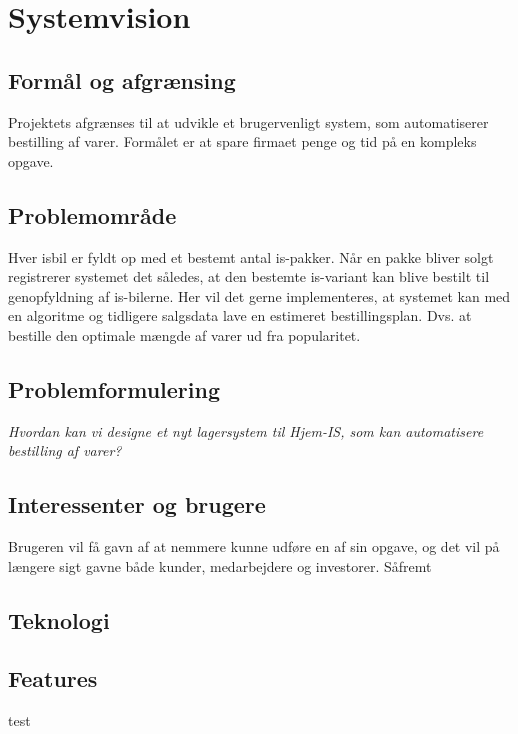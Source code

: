 \chapter{Systemvision}\label{ch:systemvision}

\section{Formål og afgrænsing}
Projektets afgrænses til at udvikle et brugervenligt system, som automatiserer bestilling af varer. 
Formålet er at spare firmaet penge og tid på en kompleks opgave.

\section{Problemområde}
Hver isbil er fyldt op med et bestemt antal is-pakker. Når en pakke bliver solgt registrerer systemet det således, at den bestemte is-variant kan blive bestilt til genopfyldning af is-bilerne. Her vil det gerne implementeres, at systemet kan med en algoritme og tidligere salgsdata lave en estimeret bestillingsplan. Dvs. at bestille den optimale mængde af varer ud fra popularitet. 


\section{Problemformulering}
 \textit{Hvordan kan vi designe et nyt lagersystem til Hjem-IS, som kan automatisere bestilling af varer?}

 \section{Interessenter og brugere}
 Brugeren vil få gavn af at nemmere kunne udføre en af sin opgave, og det vil på længere sigt gavne både kunder, medarbejdere og investorer. Såfremt 

 \section{Teknologi}

 \section{Features}
test